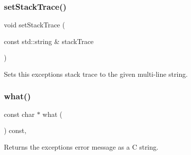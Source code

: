\subsubsection{\texorpdfstring{set\+Stack\+Trace()}{setStackTrace()}}
{\footnotesize\ttfamily void set\+Stack\+Trace (\begin{DoxyParamCaption}\item[{const std\+::string \&}]{stack\+Trace }\end{DoxyParamCaption})\hspace{0.3cm}{\ttfamily [protected]}}



Sets this exception\textquotesingle{}s stack trace to the given multi-\/line string. 

\mbox{\label{classErrorException_a576a441c2b1e2f01d271e237b314eac3}} 
\subsubsection{\texorpdfstring{what()}{what()}}
{\footnotesize\ttfamily const char $\ast$ what (\begin{DoxyParamCaption}{ }\end{DoxyParamCaption}) const\hspace{0.3cm}{\ttfamily [virtual]}, {\ttfamily [noexcept]}}



Returns the exception\textquotesingle{}s error message as a C string. 

